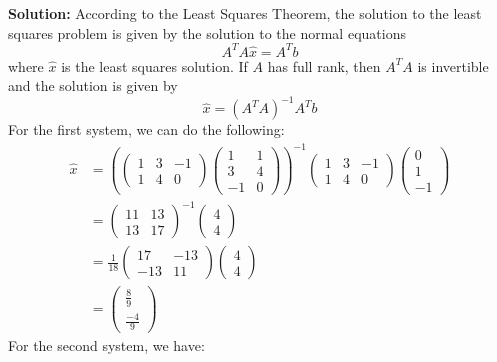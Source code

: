 \documentclass{article}
\begin{document}
\vspace{0.5cm}
\noindent\textbf{Solution:} According to the Least Squares Theorem, the solution to the least squares problem is given by
the solution to the normal equations 
$$ A^T A \hat{x} = A^T b $$
where $\hat{x}$ is the least squares solution.
If $A$ has full rank, then $A^T A$ is invertible and the solution is given by
$$ \hat{x} = (A^T A)^{-1} A^T b $$
For the first system, we can do the following:
\begin{align*}
    \hat{x} &= \left( \begin{pmatrix} 1 & 3 & -1 \\ 1 & 4 & 0 \end{pmatrix} \begin{pmatrix} 1 & 1 \\ 3 & 4 \\ -1 & 0 \end{pmatrix} \right)^{-1} \begin{pmatrix} 1 & 3 & -1 \\ 1 & 4 & 0 \end{pmatrix} \begin{pmatrix} 0 \\ 1 \\ -1 \end{pmatrix} \\
    &= \left( \begin{matrix} 11 & 13 \\ 13 & 17 \end{matrix} \right)^{-1} \begin{pmatrix} 4 \\ 4 \end{pmatrix} \\
    &= \frac{1}{18} \begin{pmatrix} 17 & -13 \\ -13 & 11 \end{pmatrix} \begin{pmatrix} 4 \\ 4 \end{pmatrix} \\
    &= \begin{pmatrix} \frac{8}{9} \\ \frac{-4}{9} \end{pmatrix}
\end{align*}
For the second system, we have:
\end{document}
